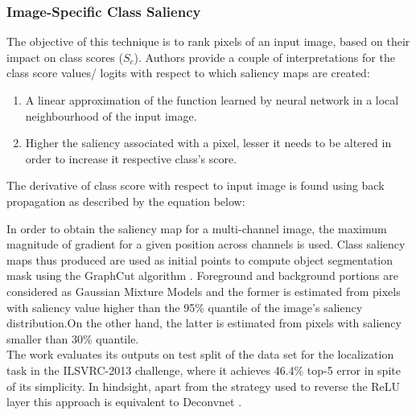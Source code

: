 \documentclass[../report.tex]{subfiles}
\begin{document}
 \subsubsection{Image-Specific Class Saliency}
  The objective of this technique is to rank pixels of an input image, based on their impact on class scores ($S_c$). Authors provide a couple of interpretations for the class score values/ logits with respect to which saliency maps are created:
  \begin{enumerate}
  	\item A linear approximation of the function learned by  neural network in a local neighbourhood of the input image.
  	\item Higher the saliency associated with a pixel, lesser it needs to be altered in order to increase it respective class’s score.  
  \end{enumerate}

 The derivative of class score with respect to input image is found using back propagation as described by the equation below:
 
 
 
 In order to obtain the saliency map for a multi-channel image, the maximum magnitude of gradient for a given position across channels is used. Class saliency maps thus produced are used as initial points  to compute object segmentation mask using the GraphCut algorithm \cite{boykov2006graph}. Foreground and background portions are considered as Gaussian Mixture Models and the former is estimated from pixels with saliency value higher than the 95\% quantile of the image’s saliency distribution.On the other hand, the latter is estimated from pixels with saliency smaller than 30\% quantile.\\
 The work evaluates its outputs on test split of the data set for the localization task in the ILSVRC-2013 \cite{ILSVRC15} challenge, where it achieves 46.4\% top-5 error in spite of its simplicity.
 In hindsight, apart from the strategy used to reverse the ReLU layer this approach is equivalent to Deconvnet \cite{matthew2014visualizing}.
 
\end{document}
